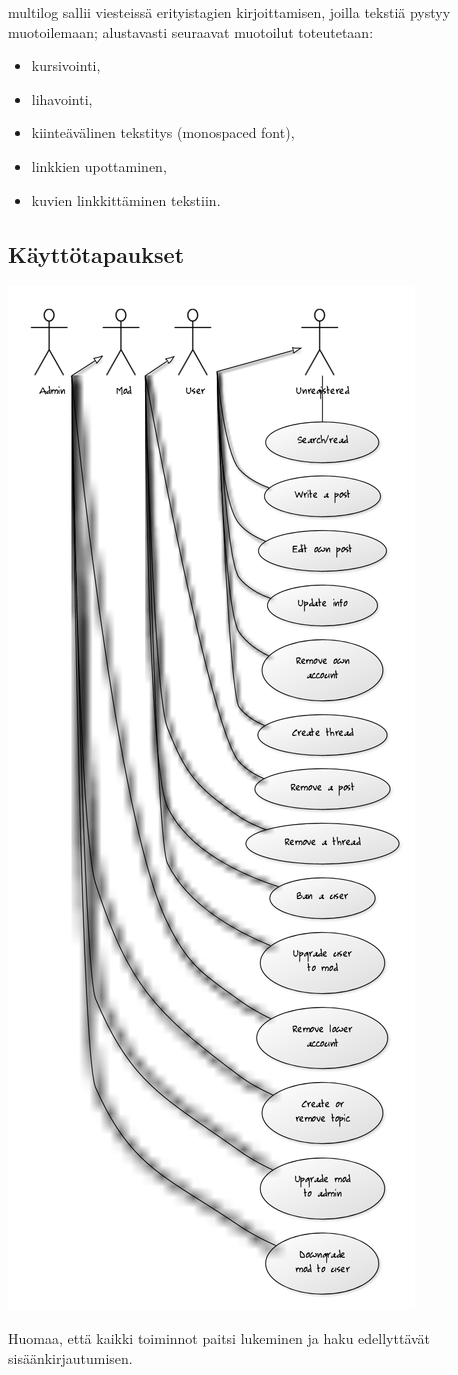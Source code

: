 \documentclass[10pt]{article}
\begin{document}
multilog sallii viesteissä erityistagien kirjoittamisen, joilla tekstiä pystyy muotoilemaan; alustavasti seuraavat muotoilut toteutetaan:
\begin{itemize}
  \item kursivointi,
  \item lihavointi,
  \item kiinteävälinen tekstitys (monospaced font),
  \item linkkien upottaminen,
  \item kuvien linkkittäminen tekstiin.
\end{itemize}

\subsection{Käyttötapaukset}
\includegraphics[width=\textwidth, height=0.9\textheight, keepaspectratio]{multilog_use_case_diagram}

\noindent Huomaa, että kaikki toiminnot paitsi lukeminen ja haku edellyttävät sisäänkirjautumisen.
\subsecti
\end{document}
